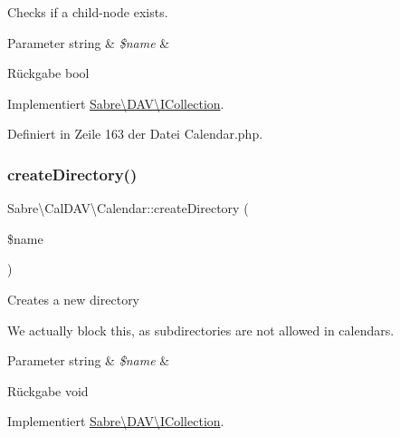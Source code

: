 Checks if a child-\/node exists.


\begin{DoxyParams}[1]{Parameter}
string & {\em \$name} & \\
\hline
\end{DoxyParams}
\begin{DoxyReturn}{Rückgabe}
bool 
\end{DoxyReturn}


Implementiert \mbox{\hyperlink{interface_sabre_1_1_d_a_v_1_1_i_collection_a81b44dc1354370890279af58c34c7375}{Sabre\textbackslash{}\+D\+A\+V\textbackslash{}\+I\+Collection}}.



Definiert in Zeile 163 der Datei Calendar.\+php.

\mbox{\label{class_sabre_1_1_cal_d_a_v_1_1_calendar_a3b7a4211a2077bce91c8e369b35279d7}} 
\subsubsection{\texorpdfstring{create\+Directory()}{createDirectory()}}
{\footnotesize\ttfamily Sabre\textbackslash{}\+Cal\+D\+A\+V\textbackslash{}\+Calendar\+::create\+Directory (\begin{DoxyParamCaption}\item[{}]{\$name }\end{DoxyParamCaption})}

Creates a new directory

We actually block this, as subdirectories are not allowed in calendars.


\begin{DoxyParams}[1]{Parameter}
string & {\em \$name} & \\
\hline
\end{DoxyParams}
\begin{DoxyReturn}{Rückgabe}
void 
\end{DoxyReturn}


Implementiert \mbox{\hyperlink{interface_sabre_1_1_d_a_v_1_1_i_collection_a11e8eb888fffe1d792acebbe5bc59243}{Sabre\textbackslash{}\+D\+A\+V\textbackslash{}\+I\+Collection}}.



